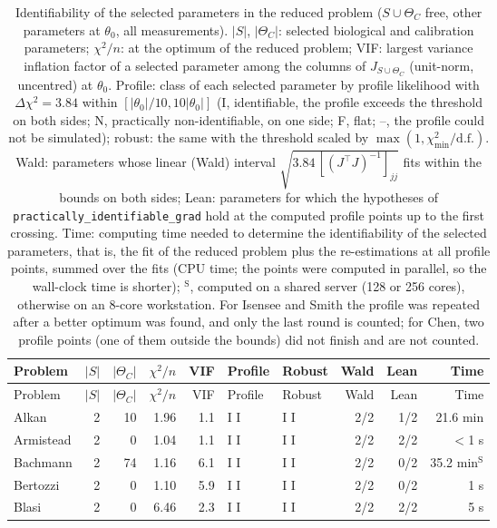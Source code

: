 \begin{longtable}{@{}lrrrrllrrr@{}}
\caption{Identifiability of the selected parameters in the reduced problem ($S\cup\Theta_C$ free, other parameters at $\theta_0$, all measurements). $|S|$, $|\Theta_C|$: selected biological and calibration parameters; $\chi^2/n$: at the optimum of the reduced problem; VIF: largest variance inflation factor of a selected parameter among the columns of $J_{S\cup\Theta_C}$ (unit-norm, uncentred) at $\theta_0$. Profile: class of each selected parameter by profile likelihood with $\Delta\chi^2=3.84$ within $[|\theta_0|/10,10|\theta_0|]$ (I, identifiable, the profile exceeds the threshold on both sides; N, practically non-identifiable, on one side; F, flat; --, the profile could not be simulated); robust: the same with the threshold scaled by $\max(1,\chi^2_{\min}/\mathrm{d.f.})$. Wald: parameters whose linear (Wald) interval $\sqrt{3.84\,[(J^{\top}J)^{-1}]_{jj}}$ fits within the bounds on both sides; Lean: parameters for which the hypotheses of \texttt{practically\_identifiable\_grad} hold at the computed profile points up to the first crossing. Time: computing time needed to determine the identifiability of the selected parameters, that is, the fit of the reduced problem plus the re-estimations at all profile points, summed over the fits (CPU time; the points were computed in parallel, so the wall-clock time is shorter); $^{\mathrm{S}}$, computed on a shared server (128 or 256 cores), otherwise on an 8-core workstation. For Isensee and Smith the profile was repeated after a better optimum was found, and only the last round is counted; for Chen, two profile points (one of them outside the bounds) did not finish and are not counted.}\label{tab:identif}\\
\toprule
Problem & $|S|$ & $|\Theta_C|$ & $\chi^2/n$ & VIF & Profile & Robust & Wald & Lean & Time \\
\midrule
\endfirsthead
\toprule
Problem & $|S|$ & $|\Theta_C|$ & $\chi^2/n$ & VIF & Profile & Robust & Wald & Lean & Time \\
\midrule
\endhead
Alkan & 2 & 10 & 1.96 & 1.1 & I I & I I & 2/2 & 1/2 & 21.6 min \\
Armistead & 2 & 0 & 1.04 & 1.1 & I I & I I & 2/2 & 2/2 & $<$1 s \\
Bachmann & 2 & 74 & 1.16 & 6.1 & I I & I I & 2/2 & 0/2 & 35.2 min$^{\mathrm{S}}$ \\
Bertozzi & 2 & 0 & 1.10 & 5.9 & I I & I I & 2/2 & 0/2 & 1 s \\
Blasi & 2 & 0 & 6.46 & 2.3 & I I & I I & 2/2 & 2/2 & 5 s \\

\end{longtable}
